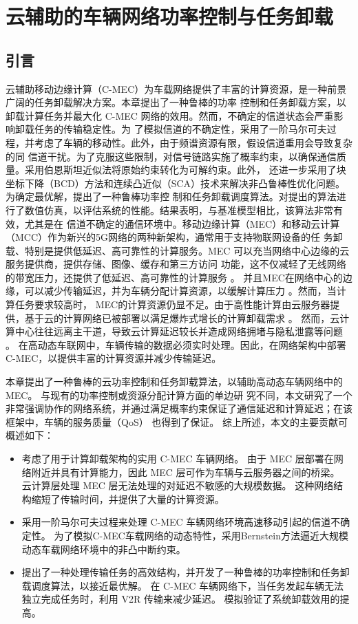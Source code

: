 \chapter{云辅助的车辆网络功率控制与任务卸载} \label{chap:table}  %

\section{引言}\label{section3-1} \label{chap:introduction}
云辅助移动边缘计算（C-MEC）为车载网络提供了丰富的计算资源，是一种前景广阔的任务卸载解决方案。本章提出了一种鲁棒的功率
控制和任务卸载方案，以卸载计算任务并最大化 C-MEC 网络的效用。然而，不确定的信道状态会严重影响卸载任务的传输稳定性。为
了模拟信道的不确定性，采用了一阶马尔可夫过程，并考虑了车辆的移动性。此外，由于频谱资源有限，假设信道重用会导致复杂的同
信道干扰。为了克服这些限制，对信号链路实施了概率约束，以确保通信质量。采用伯恩斯坦近似法将原始约束转化为可解约束。此外，
还进一步采用了块坐标下降（BCD）方法和连续凸近似（SCA）技术来解决非凸鲁棒性优化问题。为确定最优解，提出了一种鲁棒功率控
制和任务卸载调度算法。对提出的算法进行了数值仿真，以评估系统的性能。结果表明，与基准模型相比，该算法非常有效，尤其是在
信道不确定的通信环境中。移动边缘计算（MEC）和移动云计算（MCC）作为新兴的5G网络的两种新架构，通常用于支持物联网设备的任
务卸载、特别是提供低延迟、高可靠性的计算服务。MEC 可以充当网络中心边缘的云服务提供商，提供存储、图像、缓存和第三方访问
功能，这不仅减轻了无线网络的带宽压力，还提供了低延迟、高可靠性的计算服务 \cite{基于车辆边缘计算的任务卸载策略研究}。
并且MEC在网络中心的边缘，可以减少传输延迟，并为车辆分配计算资源，以缓解计算压力 \cite{CCO}。然而，当计算任务要求较高时，
MEC的计算资源仍显不足。由于高性能计算由云服务器提供，基于云的计算网络已被部署以满足爆炸式增长的计算卸载需求 \supercite{Towards2024,SurveyMEC2017,SurveyMEC2018,DistributedTask2024}。
然而，云计算中心往往远离主干道，导致云计算延迟较长并造成网络拥堵与隐私泄露等问题 \supercite{Qian2023, 曹宇慧车载边缘计算环境下任务协同卸载方法研究,云计算隐私10418975}。
在高动态车联网中，车辆传输的数据必须实时处理。因此，在网络架构中部署C-MEC，以提供丰富的计算资源并减少传输延迟。

本章提出了一种鲁棒的云功率控制和任务卸载算法，以辅助高动态车辆网络中的 MEC。 与现有的功率控制或资源分配计算方面的单边研
究不同，本文研究了一个非常强调协作的网络系统，并通过满足概率约束保证了通信延迟和计算延迟；在该框架中，车辆的服务质量（QoS）
也得到了保证。 综上所述，本文的主要贡献可概述如下：
\begin{itemize}
\item 考虑了用于计算卸载架构的实用 C-MEC 车辆网络。 由于 MEC 层部署在网络附近并具有计算能力，因此 MEC 层可作为车辆与云服务器之间的桥梁。 云计算层处理 MEC
      层无法处理的对延迟不敏感的大规模数据。 这种网络结构缩短了传输时间，并提供了大量的计算资源。
\item 采用一阶马尔可夫过程来处理 C-MEC 车辆网络环境高速移动引起的信道不确定性。 为了模拟C-MEC车载网络的动态特性，采用Bernstein方法逼近大规模动态车载网络环境中的非凸中断约束。
\item 提出了一种处理传输任务的高效结构，并开发了一种鲁棒的功率控制和任务卸载调度算法，以接近最优解。 在 C-MEC 车辆网络下，当任务发起车辆无法独立完成任务时，利用 V2R 传输来减少延迟。 模拟验证了系统卸载效用的提高。
\end{itemize}
